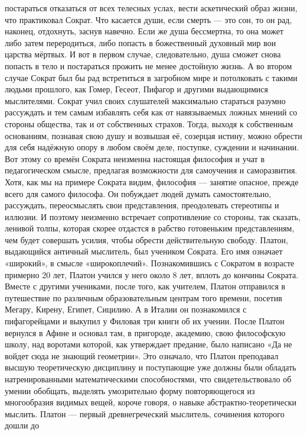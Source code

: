 постараться отказаться от всех телесных услах, вести аскетический образ жизни,
что практиковал Сократ. Что касается души, если смерть — это сон, то он рад,
наконец, отдохнуть, заснув навечно. Если же душа бессмертна, то она может либо
затем переродиться, либо попасть в божественный духовный мир вои царства
мёртвых. И вот в первом случае, следовательно, душа сможет снова попасть в тело
и постараться прожить не менее достойную жизнь. А во втором случае Сократ был бы
рад встретиться в загробном мире и потолковать с такими людьми прошлого, как
Гомер, Гесеот, Пифагор и другими выдающимися мыслителями. Сократ учил своих
слушателей максимально стараться разумно рассуждать и тем самым избавлять себя
как от навязываемых ложных мнений со стороны общества, так и от собственных
страхов. Тогда, выходя к собственным основаниям, познавая свою душу и возвышая
её, созерцая истину, можно обрести для себя надёжную опору в любом своём деле,
поступке, суждении и начинании. Вот этому со времён Сократа неизменна настоящая
философия и учат в педагогическом смысле, предлагая возможности для самоучения и
саморазвития. Хотя, как мы на примере Сократа видим, философия — занятие
опасное, прежде всего для самого философа. Он побуждает людей думать
самостоятельно, рассуждать, переосмыслять свои представления, преодолевать
стереотипы и иллюзии. И поэтому неизменно встречает сопротивление со стороны,
так сказать, ленивой толпы, которая скорее отдастся в рабство готовеньким
представлениям, чем будет совершать усилия, чтобы обрести действительную
свободу. Платон, выдающийся античный мыслитель, был учеником Сократа. Его имя
означает «широкий», в смысле «широкоплечий». Познакомившись с Сократом в
возрасте примерно 20 лет, Платон учился у него около 8 лет, вплоть до кончины
Сократа. Вместе с другими учениками, после того, как учителем, Платон отправился
в путешествие по различным образовательным центрам того времени, посетив Мегару,
Кирену, Египет, Сицилию. А в Италии он познакомился с пифагорейцами и выкупил у
Филовая три книги об их учении. После Платон вернулся в Афине и основал там, в
пригороде, академию, свою философскую школу, над воротами которой, как
утверждает предание, было написано «Да не войдет сюда не знающий геометрии». Это
означало, что Платон преподавал высшую теоретическую дисциплину и поступающие
уже должны были обладать натренированными математическими способностями, что
свидетельствовало об умении обобщать, выделять умозрительно форму повторяющегося
из многообразия видимых вещей, короче говоря, о навыке абстрактно-теоретически
мыслить. Платон — первый древнегреческий мыслитель, сочинения которого дошли до
